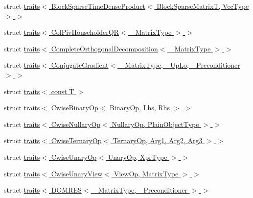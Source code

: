\begin{DoxyCompactItemize}
\item 
struct \hyperlink{struct_eigen_1_1internal_1_1traits_3_01_block_sparse_time_dense_product_3_01_block_sparse_matrix_t_00_01_vec_type_01_4_01_4}{traits$<$ Block\+Sparse\+Time\+Dense\+Product$<$ Block\+Sparse\+Matrix\+T, Vec\+Type $>$ $>$}
\item 
struct \hyperlink{struct_eigen_1_1internal_1_1traits_3_01_col_piv_householder_q_r_3_01___matrix_type_01_4_01_4}{traits$<$ Col\+Piv\+Householder\+Q\+R$<$ \+\_\+\+Matrix\+Type $>$ $>$}
\item 
struct \hyperlink{struct_eigen_1_1internal_1_1traits_3_01_complete_orthogonal_decomposition_3_01___matrix_type_01_4_01_4}{traits$<$ Complete\+Orthogonal\+Decomposition$<$ \+\_\+\+Matrix\+Type $>$ $>$}
\item 
struct \hyperlink{struct_eigen_1_1internal_1_1traits_3_01_conjugate_gradient_3_01___matrix_type_00_01___up_lo_00_01___preconditioner_01_4_01_4}{traits$<$ Conjugate\+Gradient$<$ \+\_\+\+Matrix\+Type, \+\_\+\+Up\+Lo, \+\_\+\+Preconditioner $>$ $>$}
\item 
struct \hyperlink{struct_eigen_1_1internal_1_1traits_3_01const_01_t_01_4}{traits$<$ const T $>$}
\item 
struct \hyperlink{struct_eigen_1_1internal_1_1traits_3_01_cwise_binary_op_3_01_binary_op_00_01_lhs_00_01_rhs_01_4_01_4}{traits$<$ Cwise\+Binary\+Op$<$ Binary\+Op, Lhs, Rhs $>$ $>$}
\item 
struct \hyperlink{struct_eigen_1_1internal_1_1traits_3_01_cwise_nullary_op_3_01_nullary_op_00_01_plain_object_type_01_4_01_4}{traits$<$ Cwise\+Nullary\+Op$<$ Nullary\+Op, Plain\+Object\+Type $>$ $>$}
\item 
struct \hyperlink{struct_eigen_1_1internal_1_1traits_3_01_cwise_ternary_op_3_01_ternary_op_00_01_arg1_00_01_arg2_00_01_arg3_01_4_01_4}{traits$<$ Cwise\+Ternary\+Op$<$ Ternary\+Op, Arg1, Arg2, Arg3 $>$ $>$}
\item 
struct \hyperlink{struct_eigen_1_1internal_1_1traits_3_01_cwise_unary_op_3_01_unary_op_00_01_xpr_type_01_4_01_4}{traits$<$ Cwise\+Unary\+Op$<$ Unary\+Op, Xpr\+Type $>$ $>$}
\item 
struct \hyperlink{struct_eigen_1_1internal_1_1traits_3_01_cwise_unary_view_3_01_view_op_00_01_matrix_type_01_4_01_4}{traits$<$ Cwise\+Unary\+View$<$ View\+Op, Matrix\+Type $>$ $>$}
\item 
struct \hyperlink{struct_eigen_1_1internal_1_1traits_3_01_d_g_m_r_e_s_3_01___matrix_type_00_01___preconditioner_01_4_01_4}{traits$<$ D\+G\+M\+R\+E\+S$<$ \+\_\+\+Matrix\+Type, \+\_\+\+Preconditioner $>$ $>$}

\end{DoxyCompactItemize}
